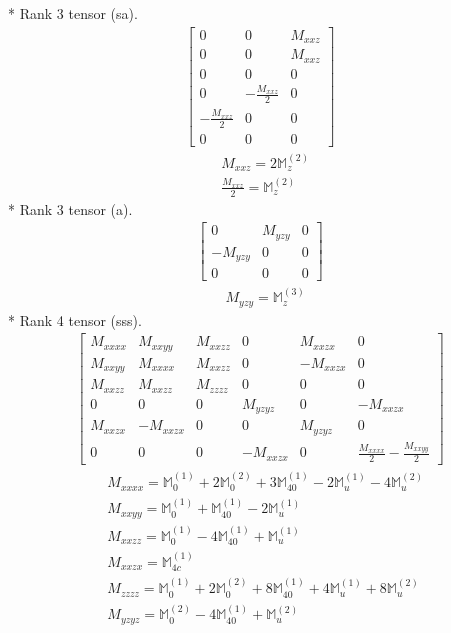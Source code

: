 \documentclass[fleqn,8pt,landscape]{jsarticle}
\begin{document}
* Rank 3 tensor (sa).
\begin{align*}
\begin{bmatrix} 0 & 0 & M_{xxz} \\ 0 & 0 & M_{xxz} \\ 0 & 0 & 0 \\ 0 & - \frac{M_{xxz}}{2} & 0 \\ - \frac{M_{xxz}}{2} & 0 & 0 \\ 0 & 0 & 0 \end{bmatrix}
\end{align*}
\begin{align*}
& M_{xxz} = 2 \mathbb{M}_{z}^{(2)} \\
& \frac{M_{xxz}}{2} = \mathbb{M}_{z}^{(2)}
\end{align*}
* Rank 3 tensor (a).
\begin{align*}
\begin{bmatrix} 0 & M_{yzy} & 0 \\ - M_{yzy} & 0 & 0 \\ 0 & 0 & 0 \end{bmatrix}
\end{align*}
\begin{align*}
& M_{yzy} = \mathbb{M}_{z}^{(3)}
\end{align*}
* Rank 4 tensor (sss).
\begin{align*}
\begin{bmatrix} M_{xxxx} & M_{xxyy} & M_{xxzz} & 0 & M_{xxzx} & 0 \\ M_{xxyy} & M_{xxxx} & M_{xxzz} & 0 & - M_{xxzx} & 0 \\ M_{xxzz} & M_{xxzz} & M_{zzzz} & 0 & 0 & 0 \\ 0 & 0 & 0 & M_{yzyz} & 0 & - M_{xxzx} \\ M_{xxzx} & - M_{xxzx} & 0 & 0 & M_{yzyz} & 0 \\ 0 & 0 & 0 & - M_{xxzx} & 0 & \frac{M_{xxxx}}{2} - \frac{M_{xxyy}}{2} \end{bmatrix}
\end{align*}
\begin{align*}
& M_{xxxx} = \mathbb{M}_{0}^{(1)} + 2 \mathbb{M}_{0}^{(2)} + 3 \mathbb{M}_{40}^{(1)} - 2 \mathbb{M}_{u}^{(1)} - 4 \mathbb{M}_{u}^{(2)} \\
& M_{xxyy} = \mathbb{M}_{0}^{(1)} + \mathbb{M}_{40}^{(1)} - 2 \mathbb{M}_{u}^{(1)} \\
& M_{xxzz} = \mathbb{M}_{0}^{(1)} - 4 \mathbb{M}_{40}^{(1)} + \mathbb{M}_{u}^{(1)} \\
& M_{xxzx} = \mathbb{M}_{4c}^{(1)} \\
& M_{zzzz} = \mathbb{M}_{0}^{(1)} + 2 \mathbb{M}_{0}^{(2)} + 8 \mathbb{M}_{40}^{(1)} + 4 \mathbb{M}_{u}^{(1)} + 8 \mathbb{M}_{u}^{(2)} \\
& M_{yzyz} = \mathbb{M}_{0}^{(2)} - 4 \mathbb{M}_{40}^{(1)} + \mathbb{M}_{u}^{(2)}
\end{align*}
\end{document}
